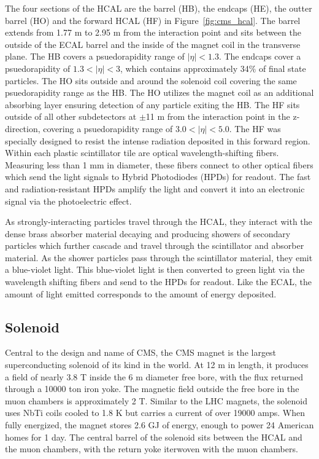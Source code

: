 The four sections of the HCAL are the barrel (HB), the endcaps (HE), the outter barrel (HO) and the forward HCAL (HF) in Figure~\ref{fig:cms_hcal}. The barrel extends from 1.77 m to 2.95 m from the interaction point and
sits between the outside of the ECAL barrel and the inside of the magnet coil in the transverse plane. The HB covers a psuedorapidity range of $|\eta| < 1.3$.
The endcaps cover a psuedorapidity of $1.3 < |\eta| < 3$, which contains approximately 34$\%$ of final state particles. The HO sits outside and around the solenoid coil covering the same psuedorapidity range
as the HB. The HO utilizes the magnet coil as an additional absorbing layer ensuring detection of any particle exiting the HB. The HF sits outside of all other subdetectors at $\pm$11 m from the interaction point in the z-direction,
covering a psuedorapidity range of $3.0 < |\eta| < 5.0$. The HF was specially designed to resist the intense radiation deposited in this forward region. Within each plastic scintillator tile are optical wavelength-shifting fibers.
Measuring less than 1 mm in diameter, these fibers connect to other optical fibers which send the light signals to Hybrid Photodiodes (HPDs) for readout. The fast and radiation-resistant HPDs amplify the light and convert it
into an electronic signal via the photoelectric effect.

As strongly-interacting particles travel through the HCAL, they interact with the dense brass absorber material decaying and producing showers of secondary particles which further cascade and travel through the scintillator and absorber material.
As the shower particles pass through the scintillator material, they emit a blue-violet light. This blue-violet light is then converted to green light via the wavelength shifting fibers and send to the HPDs for readout. Like the ECAL,
the amount of light emitted corresponds to the amount of energy deposited. 

\subsection{Solenoid}
Central to the design and name of CMS, the CMS magnet is the largest superconducting solenoid of its kind in the world.
At 12 m in length, it produces a field of nearly 3.8 T inside the 6 m diameter free bore, with the flux returned through a 10000 ton iron yoke.
The magnetic field outside the free bore in the muon chambers is approximately 2 T.  
Similar to the LHC magnets, the solenoid uses NbTi coils cooled to 1.8 K but carries a current of over 19000 amps. When fully energized, the magnet
stores 2.6 GJ of energy, enough to power 24 American homes for 1 day\cite{magnet_energy}. The central barrel of the solenoid sits between the HCAL and the muon chambers, with the return yoke iterwoven with the muon chambers.

